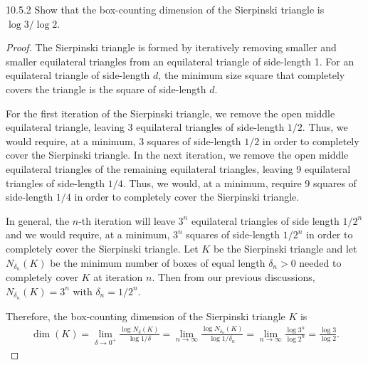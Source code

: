 \begin{problem}{10.5.2}
  Show that the box-counting dimension of the Sierpinski triangle is $\log 3 / \log 2$.
\end{problem}

\begin{proof}
  The Sierpinski triangle is formed by iteratively removing smaller and smaller
  equilateral triangles from an equilateral triangle of side-length 1. For an
  equilateral triangle of side-length $d$, the minimum size square that completely covers
  the triangle is the square of side-length $d$.

  For the first iteration of the Sierpinski triangle, we remove the open middle
  equilateral triangle, leaving 3 equilateral triangles of side-length $1/2$.
  Thus, we would require, at a minimum, 3 squares of side-length $1/2$ in order to completely
  cover the Sierpinski triangle. In the next iteration, we remove the open middle
  equilateral triangles of the remaining equilateral triangles, leaving 9 equilateral
  triangles of side-length $1/4$. Thus, we would, at a minimum, require 9 squares of side-length $1/4$
  in order to completely cover the Sierpinski triangle.

  In general, the $n$-th iteration will leave $3^n$ equilateral triangles of side length $1/2^n$ and
  we would require, at a minimum, $3^n$ squares of side-length $1/2^n$ in order to completely cover the Sierpinski triangle.
  Let $K$ be the Sierpinski triangle and let $N_{\delta_n}(K)$ be the minimum number of boxes of equal length $\delta_n > 0$
  needed to completely cover $K$ at iteration $n$. Then from our previous discussions, $N_{\delta_n}(K) = 3^n$
  with $\delta_n = 1/2^n$.

  Therefore, the box-counting dimension of the Sierpinski triangle $K$ is
  \begin{align*}
    \dim(K) = \lim_{\delta \to 0^+}\frac{\log N_\delta(K)}{\log 1/\delta} = \lim_{n\to\infty} \frac{\log N_{\delta_n}(K)}{\log 1/\delta_n} = \lim_{n\to\infty} \frac{\log 3^n}{\log 2^n} = \frac{\log 3}{\log 2}.
  \end{align*}
\end{proof}
\newpage
